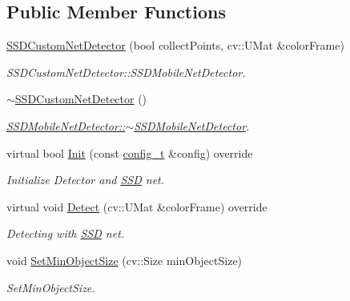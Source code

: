 \subsection*{Public Member Functions}
\begin{DoxyCompactItemize}
\item 
\mbox{\hyperlink{class_s_s_d_custom_net_detector_acb89dc911dd7b4b300a00789a76c8d8d}{S\+S\+D\+Custom\+Net\+Detector}} (bool collect\+Points, cv\+::\+U\+Mat \&color\+Frame)
\begin{DoxyCompactList}\small\item\em S\+S\+D\+Custom\+Net\+Detector\+::\+S\+S\+D\+Mobile\+Net\+Detector. \end{DoxyCompactList}\item 
\mbox{\hyperlink{class_s_s_d_custom_net_detector_af64774d3fabf485a810eee39f1a7d278}{$\sim$\+S\+S\+D\+Custom\+Net\+Detector}} ()
\begin{DoxyCompactList}\small\item\em \mbox{\hyperlink{class_s_s_d_mobile_net_detector_aab4a87e950c5d0ea2631f8f7d521dc1c}{S\+S\+D\+Mobile\+Net\+Detector\+::$\sim$\+S\+S\+D\+Mobile\+Net\+Detector}}. \end{DoxyCompactList}\item 
virtual bool \mbox{\hyperlink{class_s_s_d_custom_net_detector_a2f228b0c7bbd679ff310158de119169b}{Init}} (const \mbox{\hyperlink{defines_8h_a81d657237a541d02f8eeefdd40191920}{config\+\_\+t}} \&config) override
\begin{DoxyCompactList}\small\item\em Initialize Detector and \mbox{\hyperlink{class_s_s_d}{S\+SD}} net. \end{DoxyCompactList}\item 
virtual void \mbox{\hyperlink{class_s_s_d_custom_net_detector_abcd14fa695e46fab1eab8ea5524c0ba5}{Detect}} (cv\+::\+U\+Mat \&color\+Frame) override
\begin{DoxyCompactList}\small\item\em Detecting with \mbox{\hyperlink{class_s_s_d}{S\+SD}} net. \end{DoxyCompactList}\item 
void \mbox{\hyperlink{class_base_detector_ab459f4e77cf1110cc1ee84027f0f2a03}{Set\+Min\+Object\+Size}} (cv\+::\+Size min\+Object\+Size)
\begin{DoxyCompactList}\small\item\em Set\+Min\+Object\+Size. \end{DoxyCompactList}\item 

\end{DoxyCompactItemize}
